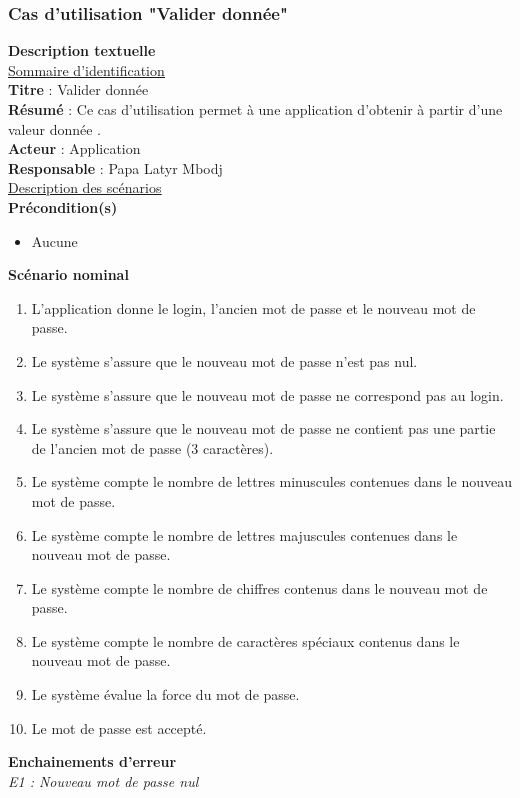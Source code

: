 \subsubsection{Cas d'utilisation "Valider donnée"}
\textbf{\RIGHTarrow Description textuelle}\\
\underline{\underline{Sommaire d’identification}} \\
\textbf{Titre} : Valider donnée \\
\textbf{Résumé} : Ce cas d’utilisation permet à une application d'obtenir à partir d'une valeur donnée .\\
\textbf{Acteur} : Application\\	
\textbf{Responsable} : Papa Latyr Mbodj\\
\underline{\underline{Description des scénarios}}\\
\textbf{Précondition(s)}
\begin{itemize}
	\item Aucune
\end{itemize}
\textbf{Scénario nominal}
\begin{enumerate}
	\item L'application donne le login, l'ancien mot de passe et le nouveau mot de passe.
	\item Le système s'assure que le nouveau mot de passe n'est pas nul.
	\item Le système s'assure que le nouveau mot de passe ne correspond pas au login.
	\item Le système s'assure que le nouveau mot de passe ne contient pas une partie de l'ancien mot de passe (3 caractères).
	\item Le système compte le nombre de lettres minuscules contenues dans le nouveau mot de passe.
	\item Le système compte le nombre de lettres majuscules contenues dans le nouveau mot de passe.
	\item Le système compte le nombre de chiffres contenus dans le nouveau mot de passe.
	\item Le système compte le nombre de caractères spéciaux contenus dans le nouveau mot de passe.
	\item Le système évalue la force du mot de passe.
	\item Le mot de passe est accepté.
\end{enumerate}
\textbf{Enchainements d’erreur}\\
\textit{E1 : Nouveau mot de passe nul}\\
